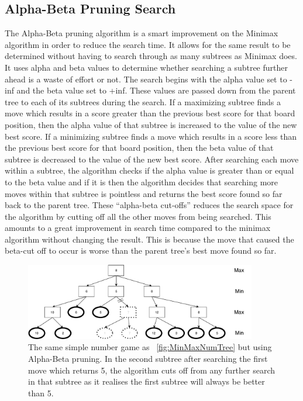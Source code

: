 \documentclass{l4proj}
\begin{document}
\subsection{Alpha-Beta Pruning Search}
The Alpha-Beta pruning algorithm is a smart improvement on the Minimax algorithm in order to reduce the search time. It allows for the same result to be determined without having to search through as many subtrees as Minimax does. It uses alpha and beta values to determine whether searching a subtree further ahead is a waste of effort or not. The search begins with the alpha value set to -inf and the beta value set to +inf. These values are passed down from the parent tree to each of its subtrees during the search. If a maximizing subtree finds a move which results in a score greater than the previous best score for that board position, then the alpha value of that subtree is increased to the value of the new best score. If a minimizing subtree finds a move which results in a score less than the previous best score for that board position, then the beta value of that subtree is decreased to the value of the new best score. After searching each move within a subtree, the algorithm checks if the alpha value is greater than or equal to the beta value and if it is then the algorithm decides that searching more moves within that subtree is pointless and returns the best score found so far back to the parent tree. These “alpha-beta cut-offs” reduces the search space for the algorithm by cutting off all the other moves from being searched. This amounts to a great improvement in search time compared to the minimax algorithm without changing the result. This is because the move that caused the beta-cut off to occur is worse than the parent tree’s best move found so far.

\begin{figure}[!ht]
\centering
\includegraphics[width=0.9\textwidth]{ABNumTree.pdf}

\caption{The same simple number game as ~\autoref{fig:MinMaxNumTree} but using Alpha-Beta pruning. In the second subtree after searching the first move which returns 5, the algorithm cuts off from any further search in that subtree as it realises the first subtree will always be better than 5. }
\label{fig:ABNumTree}
\end{figure}
\end{document}
